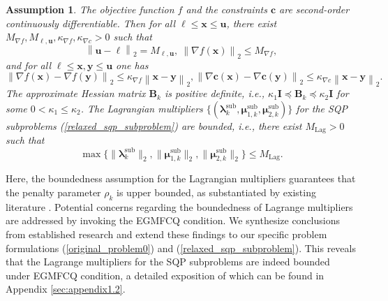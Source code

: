 \documentclass[aos]{imsart}
\numberwithin{equation}{section}
\theoremstyle{plain}
\newtheorem{assumption}{Assumption}
\begin{document}
\begin{assumption}
    \label{assump2}
    The objective function $f$ and the constraints $\bm{c}$ are second-order continuously differentiable. Then for all $\bm{\ell} \leq \bm{x} \leq \bm{u}$, there exist $M_{\nabla f}, M_{\bm{\ell},\bm{u}}, \kappa_{\nabla f}, \kappa_{\nabla c}>0$ such that
    \begin{equation*}
        \left\|\bm{u} - \bm{\ell} \right\|_2 = M_{\bm{\ell},\bm{u}},~\left\| \nabla f(\bm{x})\right\|_2 \leq M_{\nabla f},
    \end{equation*}
    and for all $\bm{\ell} \leq \bm{x}, \bm{y} \leq \bm{u}$ one has
    \begin{equation*}
        \left\|\nabla f(\bm{x})-\nabla f(\bm{y}) \right\|_2 \leq \kappa_{\nabla f} \left\|\bm{x} - \bm{y} \right\|_2, \left\|\nabla \bm{c}(\bm{x})-\nabla \bm{c}(\bm{y}) \right\|_2 \leq \kappa_{\nabla c} \left\|\bm{x} - \bm{y} \right\|_2.
    \end{equation*}
    The approximate Hessian matrix $\bm{B}_k$ is positive definite, i.e., $\kappa_1 \mathbf{I} \preceq \bm{B}_k \preceq \kappa_2 \mathbf{I}$ for some $0<\kappa_1 \leq \kappa_2$. The Lagrangian multipliers $\{(\bm{\lambda}_{k}^{\text{sub}},  \bm{\mu}_{1,k}^{\text{sub}}, \bm{\mu}_{2,k}^{\text{sub}})\}$ for the SQP subproblems (\ref{relaxed_sqp_subproblem}) are bounded, i.e., there exist $M_{\text{Lag}}>0$ such that 
    \begin{equation*}
        \max\{\|\bm{\lambda}_{k}^{\text{sub}}\|_2, \|\bm{\mu}_{1,k}^{\text{sub}}\|_2, \|\bm{\mu}_{2,k}^{\text{sub}}\|_2\} \leq M_{\text{Lag}}.
    \end{equation*}
\end{assumption}


Here, the boundedness assumption for the Lagrangian multipliers guarantees that the penalty parameter $\rho_k$ is upper bounded, as substantiated by existing literature \cite{burke1989robust, bertsekas1997nonlinear}. 
Potential concerns regarding the boundedness of Lagrange multipliers are addressed by invoking the EGMFCQ condition.  We synthesize conclusions from established research \cite{burke1989robust, gauvin1977necessary} and extend these findings to our specific problem formulations (\ref{original_problem0}) and (\ref{relaxed_sqp_subproblem}).
This reveals that the Lagrange multipliers for the SQP subproblems are indeed bounded under EGMFCQ condition, a detailed exposition of which can be found in Appendix \ref{sec:appendix1.2}.
\end{document}
